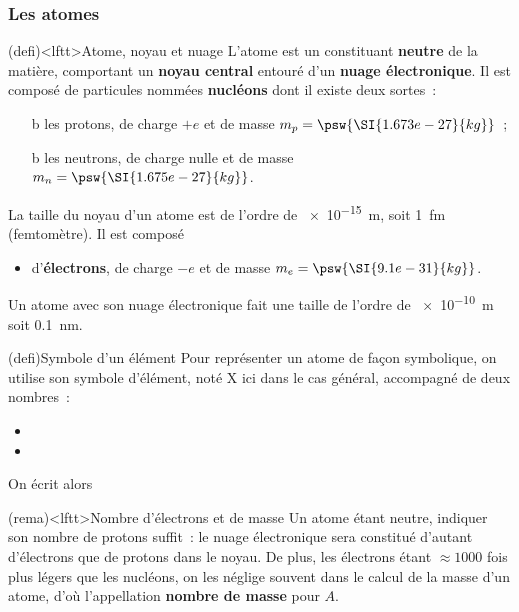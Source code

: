 \documentclass[../../main/main.tex]{subfiles}
\begin{document}
\subsubsection{Les atomes}
\begin{tcb}(defi)<lftt>{Atome, noyau et nuage}
	L'atome est un constituant \textbf{neutre} de la matière, comportant un
	\textbf{noyau central} entouré d'un \textbf{nuage électronique}.
	Il est composé de particules nommées \textbf{nucléons} dont il existe deux
	sortes~:
	\begin{itemize}
		\item[b]{les protons}, de charge $+e$ et de masse $m_p =
			      \psw{\SI{1.673e-27}{kg}}$~;
		\item[b]{les neutrons}, de charge nulle et de masse $m_n =
			      \psw{\SI{1.675e-27}{kg}}$.
	\end{itemize}
	La taille du noyau d'un atome est de l'ordre de \SI{e-15}{m}, soit
	\SI{1}{fm} (femtomètre).
	Il est composé
	\begin{itemize}
		\item d'\textbf{électrons}, de charge $-e$ et de masse $m_e =
			      \psw{\SI{9.1e-31}{kg}}$.
	\end{itemize}
	Un atome avec son nuage électronique fait une taille de l'ordre de
	\SI{e-10}{m} soit \SI{0.1}{nm}.
\end{tcb}

\begin{tcb}[label=def:numéroatomique, sidebyside, righthand ratio=.2]
	(defi){Symbole d'un élément}
	Pour représenter un atome de façon symbolique, on utilise son symbole
	d'élément, noté X ici dans le cas général, accompagné de deux nombres~:
	\begin{itemize}
		\item {}%
		\item {}%
	\end{itemize}
	\tcblower
	On écrit alors
	\psw{%
		\[
			\ce{^{A}_{Z}X}
		\]
	}%
\end{tcb}

\begin{tcb}[label=rema:atomeneutre](rema)<lftt>{Nombre d'électrons et de masse}
	Un atome étant neutre, indiquer son nombre de protons suffit~: le nuage
	électronique sera constitué d'autant d'électrons que de protons dans le
	noyau.
	\smallbreak
	De plus, les électrons étant $\approx 1000$ fois plus légers que les
	nucléons, on les néglige souvent dans le calcul de la masse d'un atome, d'où
	l'appellation \textbf{nombre de masse} pour $A$.
\end{tcb}
\end{document}
